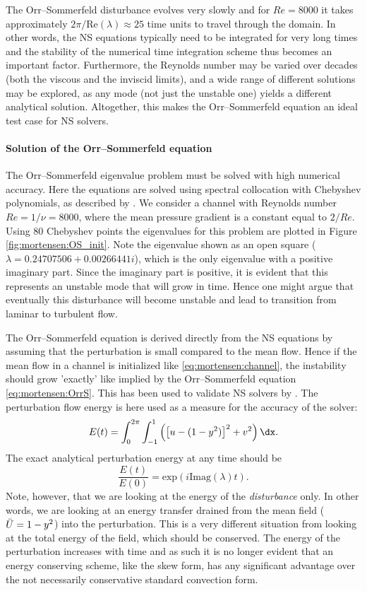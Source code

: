 The Orr--Sommerfeld disturbance evolves very slowly and for $Re=8000$ it
takes approximately $2 \pi/\text{Re}(\lambda)\approx 25$ time units to
travel through the domain. In other words, the NS equations typically need
to be integrated for very long times and the stability of the numerical
time integration scheme thus becomes an important factor. Furthermore,
the Reynolds number may be varied over decades (both the viscous and the
inviscid limits), and a wide range of different solutions may be explored,
as any mode (not just the unstable one) yields a different analytical
solution. Altogether, this makes the Orr--Sommerfeld equation an ideal
test case for NS solvers.

\paragraph{Solution of the Orr--Sommerfeld equation}

The Orr--Sommerfeld eigenvalue problem must be solved with high numerical
accuracy. Here the equations are solved using spectral collocation
with Chebyshev polynomials, as described by \citet{Trefethen2006}. We
consider a channel with Reynolds number $Re=1/\nu=8000$, where
the mean pressure gradient is a constant equal to $2/Re$. Using 80
Chebyshev points the eigenvalues for this problem are plotted in Figure
\ref{fig:mortensen:OS_init}. Note the eigenvalue shown as an open
square ($\lambda =
0.24707506 + 0.00266441 i$), which is the only eigenvalue with a positive
imaginary part. Since the imaginary part is positive, it is evident that
this represents an unstable mode that will grow in time.
Hence one might argue that eventually this disturbance will become
unstable and lead to transition from laminar to turbulent flow.

The Orr--Sommerfeld equation is derived directly from the NS
equations by assuming that the perturbation is small compared to the
mean flow. Hence if the mean flow in a channel is initialized like
\eqref{eq:mortensen:channel}, the instability should grow 'exactly' like
implied by the Orr--Sommerfeld equation \eqref{eq:mortensen:OrrS}. This
has been used to validate NS solvers by \citet{MalikZangHussaini1984}. The
perturbation flow energy is here used as a measure for the accuracy of
the solver:
\begin{equation}
  E(t)= \int_0^{2\pi}\int_{-1}^{1} \left( \left[u-(1-y^2)\right]^2
    + v^2 \right) \dx.
\end{equation}
The exact analytical perturbation energy at any time should be
\begin{equation}
 \frac{E(t)}{E(0)}=\text{exp}(i \text{Imag}(\lambda) t).
\end{equation}
Note, however, that we are looking at the energy of the
\textit{disturbance} only. In other words, we are looking at an
energy transfer drained from the mean field ($\Bar{U}=1-y^2$) into
the perturbation. This is a very different situation from looking at
the total energy of the field, which should be conserved. The energy of
the perturbation increases with time and as such it is no longer evident
that an energy conserving scheme, like the skew form, has any significant
advantage over the not necessarily conservative standard convection form.

